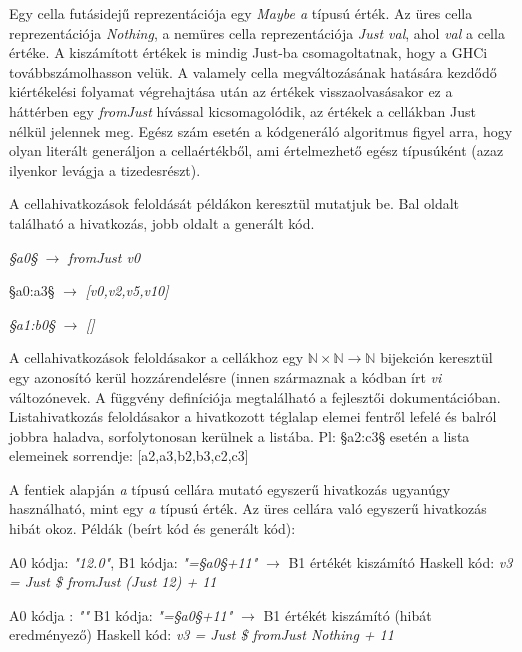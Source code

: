 Egy cella futásidejű reprezentációja egy \textit{Maybe a} típusú érték. Az üres cella reprezentációja \textit{Nothing}, a nemüres cella reprezentációja \textit{Just val}, ahol \textit{val} a cella értéke. A kiszámított értékek is mindig Just-ba csomagoltatnak, hogy a GHCi továbbszámolhasson velük. A valamely cella megváltozásának hatására kezdődő kiértékelési folyamat végrehajtása után az értékek visszaolvasásakor ez a háttérben egy \textit{fromJust} hívással kicsomagolódik, az értékek a cellákban Just nélkül jelennek meg.
Egész szám esetén a kódgeneráló algoritmus figyel arra, hogy olyan literált generáljon a cellaértékből, ami értelmezhető egész típusúként (azaz ilyenkor levágja a tizedesrészt).

A cellahivatkozások feloldását példákon keresztül mutatjuk be. Bal oldalt található a hivatkozás, jobb oldalt a generált kód.
\begin{compactenum}
	\item \textit{§a0§} $\rightarrow$ \textit{fromJust v0}
	\item §a0:a3§ $\rightarrow$ \textit{[v0,v2,v5,v10]}
	\item \textit{§a1:b0§} $\rightarrow$ \textit{[]}
\end{compactenum}

A cellahivatkozások feloldásakor a cellákhoz egy $\mathbb{N} \times \mathbb{N} \rightarrow \mathbb{N}$ bijekción keresztül egy azonosító kerül hozzárendelésre (innen származnak a kódban írt \textit{vi} változónevek. A függvény definíciója megtalálható a fejlesztői dokumentációban. Listahivatkozás feloldásakor a hivatkozott téglalap elemei fentről lefelé és balról jobbra haladva, sorfolytonosan kerülnek a listába. Pl: §a2:c3§ esetén a lista elemeinek sorrendje: [a2,a3,b2,b3,c2,c3]

A fentiek alapján \textit{a} típusú cellára mutató egyszerű hivatkozás ugyanúgy használható, mint egy \textit{a} típusú érték. Az üres cellára való egyszerű hivatkozás hibát okoz. Példák (beírt kód és generált kód):
\begin{compactenum}
	\item A0 kódja: \textit{"12.0"}, B1 kódja: \textit{"=§a0§+11"} $\rightarrow$ B1 értékét kiszámító Haskell kód: \textit{v3 = Just \$ fromJust (Just 12) + 11}
	\item A0 kódja : \textit{""} B1 kódja: \textit{"=§a0§+11"} $\rightarrow$ B1 értékét kiszámító (hibát eredményező) Haskell kód: \textit{v3 = Just \$ fromJust Nothing + 11}
\end{compactenum}

